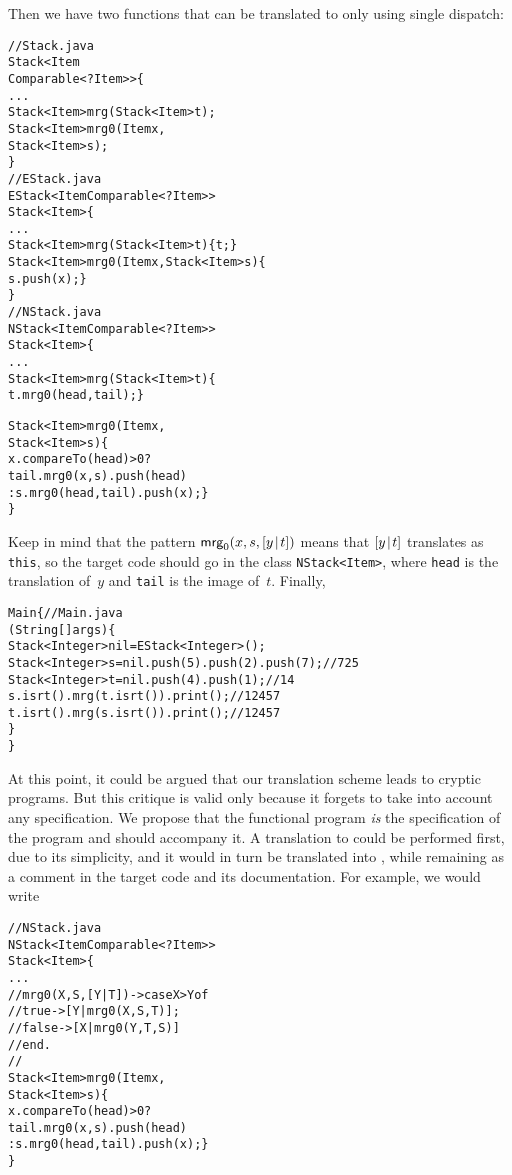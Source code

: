 Then we have two functions that can be translated to \Java only using
single dispatch:
\begin{alltt}
// Stack.java
\public \abstractX \class Stack<Item
\hfill\extends Comparable<? \super Item>> \{
  ...
  \public \abstractX Stack<Item> mrg(\final Stack<Item> t);
  \public \abstractX Stack<Item> mrg0(\final Item x,
                                   \final Stack<Item> s);
\}
// EStack.java
\public \class EStack<Item \extends Comparable<? \super Item>>
       \extends Stack<Item> \{
  ...
  \public Stack<Item> mrg(\final Stack<Item> t) \{ \return t; \}
  \public Stack<Item> mrg0(\final\! Item x,\final Stack<Item> s)\{
    \return s.push(x); \}
\}
// NStack.java
\public \class NStack<Item \extends Comparable<? \super Item>>
       \extends Stack<Item> \{
  ...
  \public Stack<Item> mrg(\final Stack<Item> t) \{
    \return t.mrg0(head,tail); \}

  \public Stack<Item> mrg0(\final Item x,
                          \final Stack<Item> s) \{
    \return x.compareTo(head) > 0 ?
           tail.mrg0(x,s).push(head)
         : s.mrg0(head,tail).push(x); \}
\}
\end{alltt}
Keep in mind that the pattern \(\textsf{mrg}_0(x,s,[{y}\!\mid\!{t}])\) means
that \([{y}\!\mid\!{t}]\) translates as \texttt{this}, so the target code
should go in the class \texttt{NStack<Item>}, where \texttt{head} is
the translation of~\(y\) and \texttt{tail} is the image of~\(t\).
Finally,
\begin{alltt}
\public \class Main \{\hfill // Main.java
  \public \static \void \main (String[] args) \{
    Stack<Integer> nil = \new EStack<Integer>();
    Stack<Integer> s = nil.push(5).push(2).push(7);\hfill// 7 2 5
    Stack<Integer> t = nil.push(4).push(1);\hfill// 1 4
    s.isrt().mrg(t.isrt()).print();\hfill// 1 2 4 5 7
    t.isrt().mrg(s.isrt()).print();\hfill// 1 2 4 5 7
  \}
\}
\end{alltt}
At this point, it could be argued that our translation scheme leads to
cryptic \Java programs. But this critique is valid only because it
forgets to take into account any specification. We propose that the
functional program \emph{is} the specification of the \Java program
and should accompany it. A translation to \Erlang could be performed
first, due to its simplicity, and it would in turn be translated into
\Java, while remaining as a comment in the target code and its
documentation. For example, we would write
\begin{alltt}
// NStack.java
\public \class NStack<Item \extends Comparable<? \super Item>>
       \extends Stack<Item> \{
  ...
  // mrg0(X,S,[Y|T]) -> case X > Y of
  //                      true  -> [Y|mrg0(X,S,T)];
  //                      false -> [X|mrg0(Y,T,S)]
  //                    end.
  //
  \public Stack<Item> mrg0(\final Item x,
                          \final Stack<Item> s) \{
    \return x.compareTo(head) > 0 ?
           tail.mrg0(x,s).push(head)
         : s.mrg0(head,tail).push(x); \}
\}
\end{alltt}
